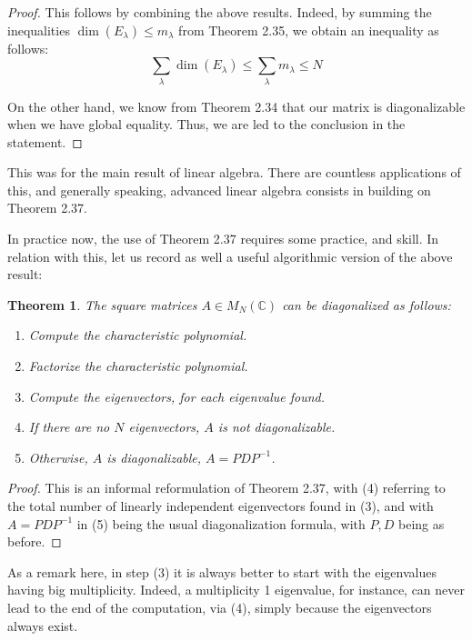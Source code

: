 \documentclass[12pt]{amsbook}
\newtheorem{theorem}{Theorem}[chapter]
\begin{document}
\begin{proof}
This follows by combining the above results. Indeed, by summing the inequalities $\dim(E_\lambda)\leq m_\lambda$ from Theorem 2.35, we obtain an inequality as follows:
$$\sum_\lambda\dim(E_\lambda)\leq\sum_\lambda m_\lambda\leq N$$

On the other hand, we know from Theorem 2.34 that our matrix is diagonalizable when we have global equality. Thus, we are led to the conclusion in the statement.
\end{proof}

This was for the main result of linear algebra. There are countless applications of this, and generally speaking, advanced linear algebra consists in building on Theorem 2.37. 

\bigskip

In practice now, the use of Theorem 2.37 requires some practice, and skill. In relation with this, let us record as well a useful algorithmic version of the above result:


\begin{theorem}
The square matrices $A\in M_N(\mathbb C)$ can be diagonalized as follows:
\begin{enumerate}
\item Compute the characteristic polynomial.

\item Factorize the characteristic polynomial.

\item Compute the eigenvectors, for each eigenvalue found.

\item If there are no $N$ eigenvectors, $A$ is not diagonalizable.

\item Otherwise, $A$ is diagonalizable, $A=PDP^{-1}$.
\end{enumerate}
\end{theorem}

\begin{proof}
This is an informal reformulation of Theorem 2.37, with (4) referring to the total number of linearly independent eigenvectors found in (3), and with $A=PDP^{-1}$ in (5) being the usual diagonalization formula, with $P,D$ being as before.
\end{proof}

As a remark here, in step (3) it is always better to start with the eigenvalues having big multiplicity. Indeed, a multiplicity 1 eigenvalue, for instance, can never lead to the end of the computation, via (4), simply because the eigenvectors always exist.
\end{document}
